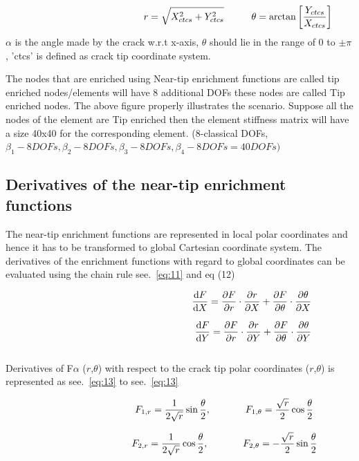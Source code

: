 \documentclass[fleqn, 12.5pt,a4paper]{report}
\newcommand\tab[1][1cm]{\hspace*{#1}}
\begin{document}
\begin{align}\label{eq:10}
\hspace{4.25cm}r = \sqrt{X_{ctcs}^2 + Y_{ctcs}^2} \tab \theta = \arctan\left[\frac{Y_{ctcs}}{X_{ctcs}}\right]
\end{align}
$\alpha$ is the angle made by the crack w.r.t x-axis, $\theta$ should lie in the range of $0$ to $\pm \pi$, 'ctcs' is defined as crack tip coordinate system.\par
The nodes that are enriched using Near-tip enrichment functions are called tip enriched nodes/elements will have 8 additional DOFs these nodes are called Tip enriched nodes. The above figure properly illustrates the scenario. Suppose all the nodes of the element are Tip enriched then the element stiffness matrix will have a size 40x40 for the corresponding element. (8-classical DOFs, $\beta_1- 8 DOFs, \beta_2- 8 DOFs, \beta_3- 8 DOFs, \beta_4- 8 DOFs = 40 DOFs)$

\subsection{Derivatives of the near-tip enrichment functions}
The near-tip enrichment functions are represented in local polar coordinates and hence it has to be transformed to global Cartesian coordinate system. The derivatives of the enrichment functions with regard to global coordinates can be evaluated using the chain rule see.~\autoref{eq:11} and eq (12) \cite{mohammadi2008extended} 

\begin{align}\label{eq:11}
\hspace{5.25cm}\dv{F}{X} = \pdv{F}{r} \cdot \pdv{r}{X} + \pdv{F}{\theta} \cdot \pdv{\theta}{X} \\[7pt]
\dv{F}{Y} = \pdv{F}{r} \cdot \pdv{r}{Y} + \pdv{F}{\theta} \cdot \pdv{\theta}{Y}
\end{align}
\\
Derivatives of F$\alpha$ ($r$,$\theta$) with respect to the crack tip polar coordinates ($r$,$\theta$) is represented as see.~\autoref{eq:13} to see.~\autoref{eq:13}

\begin{align}\label{eq:13}
\hspace{3.25cm}F_{1,r} = \frac{1}{2\sqrt r} \sin\frac{\theta}{2}, \tab[1.25cm] F_{1,\theta} = \frac{\sqrt r}{2} \cos\frac{\theta}{2}
\end{align}

\begin{align}\label{eq:143}
\hspace{3.25cm}F_{2,r} = \frac{1}{2\sqrt r} \cos\frac{\theta}{2}, \tab[1.25cm] F_{2,\theta} = -\frac{\sqrt r}{2} \sin\frac{\theta}{2}
\end{align}
\end{document}
